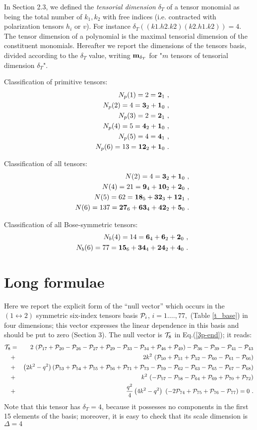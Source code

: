 \documentclass[11pt]{article}
\newcommand{\bea}{\begin{eqnarray}}
\newcommand{\eea}{\end{eqnarray}}
\def\D{\Delta}
\def\nl{\nonumber\\}
\def\p{{\cal P}}
\newcommand{\ndt}[2]{ {\bf #1}_{#2} }
\newcommand{\ntp}[1]{{N_p(#1)}} %
\newcommand{\nta}[1]{{N(#1)}}   %
\newcommand{\ntb}[1]{{N_b(#1)}} %
\def\dt{{\delta_T}} %
\begin{document}
In Section 2.3, we defined the {\it tensorial dimension}
 $\dt$ of a tensor monomial as being the total number of $k_1,k_2$ with 
free indices  (i.e. contracted with polarization tensors $h_i$ or $v$).  
For instance $\dt ( (k1.h2.k2)(k2.h1.k2))= 4$. 
The tensor dimension of a polynomial is the maximal tensorial 
dimension of the constituent monomials. 
Hereafter we report the dimensions of the tensors basis, 
divided according to the $\dt$ value, writing
$\ndt{m}{\dt}$ for "$m$ tensors of tensorial dimension $\dt$". 
    
Classification of primitive  tensors: 
\bea 
 & &\ntp{1}=2=\ndt{2}{1}\ ,\nl 
 & &\ntp{2}=4=\ndt{3}{2}+\ndt{1}{0}\ ,\nl 
 & &\ntp{3}=2=\ndt{2}{1}\ ,\nl 
 & &\ntp{4}=5=\ndt{4}{2}+\ndt{1}{0}\ ,\nl 
 & &\ntp{5}=4=\ndt{4}{1}\ ,\nl 
 & &\ntp{6}=13=\ndt{12}{2}+\ndt{1}{0}\ . 
\eea  
 
Classification of all tensors: 
\bea 
 & &\nta{2}=4=\ndt{3}{2}+\ndt{1}{0}\ ,\nl 
 & &\nta{4}=21=\ndt{9}{4}+\ndt{10}{2}+\ndt{2}{0}\ ,\nl 
 & &\nta{5}=62=\ndt{18}{5}+\ndt{32}{3}+\ndt{12}{1}\ ,\nl 
 & &\nta{6}=137=\ndt{27}{6}+\ndt{63}{4}+\ndt{42}{2}+\ndt{5}{0}\ . 
\eea   

Classification of all Bose-symmetric tensors: 
\bea 
 & &\ntb{4}=14=\ndt{6}{4}+\ndt{6}{2}+\ndt{2}{0}\ ,\nl 
 & &\ntb{6}=77=\ndt{15}{6}+\ndt{34}{4}+\ndt{24}{2}+\ndt{4}{0}\ . 
\eea 
 



\section{Long formulae}
\label{app-sol}

Here we report the explicit form of the ``null vector''
which occurs  in the $(1\leftrightarrow 2)$ symmetric
six-index tensors basis ${\cal P}_i$, $i=1.\dots,77,$
(Table \ref{t_base}) in four dimensions;
this vector expresses the linear dependence in this basis 
and should be put to zero (Section 3).
The null vector is ${\cal T}_8$ in Eq.(\ref{3p-end}); it reads:
\bea
{\cal T}_8 
&=& 2\ (\p_{17}+\p_{20}-\p_{26}-\p_{27}+\p_{29}
      -\p_{33}-\p_{34}+\p_{46}+\p_{49} ) 
  -\p_{36}-\p_{39}-\p_{41}-\p_{43} \nl
&+& 2 k^2\ (\p_{50}+\p_{51}+\p_{52}-\p_{60}-\p_{61}-\p_{66} ) \nl
&+&  \left( 2k^2 - q^2 \right) 
( \p_{53}+\p_{54}+\p_{55}+\p_{56}+\p_{71}+\p_{73}
-\p_{59}-\p_{62}-\p_{63}-\p_{65}-\p_{67}-\p_{68} ) \nl
&+&  k^2\ (-\p_{57}-\p_{58}-\p_{64}+\p_{69}+\p_{70}+\p_{72} ) \nl
&+&  \frac{q^2}{4}\left( 4k^2 - q^2 \right) \ 
   (-2\p_{74}+\p_{75}+\p_{76}-\p_{77}) = 0 \ .
\label{nul-vec}\eea
Note that this tensor has $\dt=4$, because it possesses
no components in the first 15 elements of the basis;
moreover, it is easy to check that its scale dimension is $\D=4$
\end{document}
